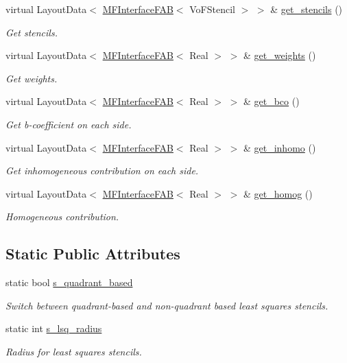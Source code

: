 \begin{DoxyCompactItemize}
virtual Layout\+Data$<$ \hyperlink{classMFInterfaceFAB}{M\+F\+Interface\+F\+AB}$<$ Vo\+F\+Stencil $>$ $>$ \& \hyperlink{classjump__bc_a556cf9aec03592c5fd0131329f94dade}{get\+\_\+stencils} ()
\begin{DoxyCompactList}\small\item\em Get stencils. \end{DoxyCompactList}\item 
virtual Layout\+Data$<$ \hyperlink{classMFInterfaceFAB}{M\+F\+Interface\+F\+AB}$<$ Real $>$ $>$ \& \hyperlink{classjump__bc_a478a04704e745f67d5b80eed8f190293}{get\+\_\+weights} ()
\begin{DoxyCompactList}\small\item\em Get weights. \end{DoxyCompactList}\item 
virtual Layout\+Data$<$ \hyperlink{classMFInterfaceFAB}{M\+F\+Interface\+F\+AB}$<$ Real $>$ $>$ \& \hyperlink{classjump__bc_a80a5c181d41f785bf6bde0eb72add6f9}{get\+\_\+bco} ()
\begin{DoxyCompactList}\small\item\em Get b-\/coefficient on each side. \end{DoxyCompactList}\item 
virtual Layout\+Data$<$ \hyperlink{classMFInterfaceFAB}{M\+F\+Interface\+F\+AB}$<$ Real $>$ $>$ \& \hyperlink{classjump__bc_a090beda76b3b16e7d4a5b594b206fd43}{get\+\_\+inhomo} ()
\begin{DoxyCompactList}\small\item\em Get inhomogeneous contribution on each side. \end{DoxyCompactList}\item 
virtual Layout\+Data$<$ \hyperlink{classMFInterfaceFAB}{M\+F\+Interface\+F\+AB}$<$ Real $>$ $>$ \& \hyperlink{classjump__bc_a90a1964bc41b3d838e4477b8f7e362da}{get\+\_\+homog} ()
\begin{DoxyCompactList}\small\item\em Homogeneous contribution. \end{DoxyCompactList}\end{DoxyCompactItemize}
\subsection*{Static Public Attributes}
\begin{DoxyCompactItemize}
\item 
static bool \hyperlink{classjump__bc_a2a3b7c5feea33c032090f89dcfee2b16}{s\+\_\+quadrant\+\_\+based}
\begin{DoxyCompactList}\small\item\em Switch between quadrant-\/based and non-\/quadrant based least squares stencils. \end{DoxyCompactList}\item 
static int \hyperlink{classjump__bc_ae95628e78361c7ca66b84f9c32a6c32c}{s\+\_\+lsq\+\_\+radius}
\begin{DoxyCompactList}\small\item\em Radius for least squares stencils. \end{DoxyCompactList}\end{DoxyCompactItemize}
